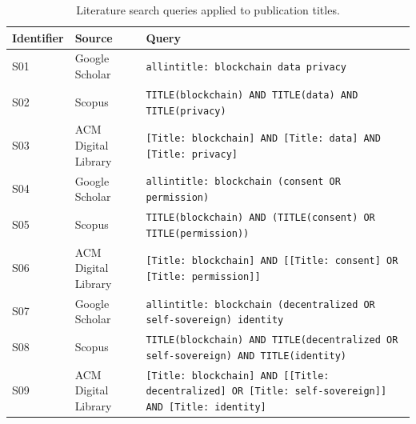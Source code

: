 \begin{table}[htbp]
\setlength{\tabcolsep}{3pt}
\centering
\footnotesize
\caption{Literature search queries applied to publication titles.}
\label{tab:search-strings}
\begin{tabular}{l>{\raggedright\arraybackslash}m{}>{\raggedright\arraybackslash}m{}}
\toprule
Identifier & Source & Query \\
\midrule
S01 & Google Scholar & \texttt{allintitle: blockchain data privacy} \\
\addlinespace[5pt]
S02 & Scopus & \texttt{TITLE(blockchain) AND TITLE(data) AND TITLE(privacy)} \\
\addlinespace[5pt]
S03 & ACM Digital Library & \texttt{[Title: blockchain] AND [Title: data] AND [Title: privacy]} \\
\addlinespace[5pt]
S04 & Google Scholar & \texttt{allintitle: blockchain (consent OR permission)} \\
\addlinespace[5pt]
S05 & Scopus & \texttt{TITLE(blockchain) AND (TITLE(consent) OR TITLE(permission))} \\
\addlinespace[5pt]
S06 & ACM Digital Library & \texttt{[Title: blockchain] AND [[Title: consent] OR [Title: permission]]} \\
\addlinespace[5pt]
S07 & Google Scholar & \texttt{allintitle: blockchain (decentralized OR self-sovereign) identity} \\
\addlinespace[5pt]
S08 & Scopus & \texttt{TITLE(blockchain) AND TITLE(decentralized OR self-sovereign) AND TITLE(identity)} \\
\addlinespace[5pt]
S09 & ACM Digital Library & \texttt{[Title: blockchain] AND [[Title: decentralized] OR [Title: self-sovereign]] AND [Title: identity]} \\
\bottomrule
\end{tabular}
\end{table}
